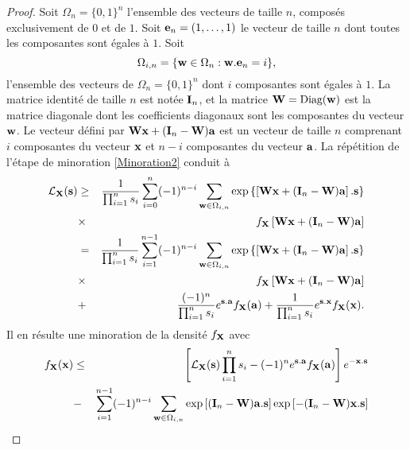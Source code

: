\begin{proof}
Soit $\Omega_{n}=\{0,1\}^{n}$ l'ensemble des vecteurs de taille $n$, composés exclusivement de $0$ et de $1$. Soit $\bold{e}_{n}=(1,\ldots,1)$ le vecteur de taille $n$ dont toutes les composantes sont égales à $1$. Soit 
\begin{equation*}
\Omega_{i,n}=\{\bold{w}\in\Omega_{n} : \bold{w}.\bold{e}_{n}=i\},
\end{equation*}
l'ensemble des vecteurs de $\Omega_{n}=\{0,1\}^{n}$ dont $i$ composantes sont égales à $1$. La matrice identité de taille $n$ est notée $\bold{I}_{n}$, et la matrice $\bold{W}=\text{Diag}(\bold{w})$ est la matrice diagonale dont les coefficients diagonaux sont les composantes du vecteur $\bold{w}$. Le vecteur défini par $\bold{W}\bold{x}+(\bold{I}_{n}-\bold{W})\bold{a}$ est un vecteur de taille $n$ comprenant $i$ composantes du vecteur $\bold{x}$ et $n-i$ composantes du vecteur $\bold{a}$.  La répétition de l'étape de minoration \eqref{Minoration2} conduit à 
\begin{eqnarray}
\mathcal{L}_{\bold{X}}(\bold{s})&\geq&\frac{1}{\prod_{i=1}^{n}s_{i}}\sum_{i=0}^{n}(-1)^{n-i}\sum_{\bold{w}\in\Omega_{i,n}}\exp\left\{\left[\bold{W}\bold{x}+(\bold{I}_{n}-\bold{W})\bold{a}\right].\bold{s}\right\}\nonumber\\
&\times&f_{\bold{X}}\left[\bold{W}\bold{x}+(\bold{I}_{n}-\bold{W})\bold{a}\right]\label{MinorationLaplaceTransform1}\\
&=&\frac{1}{\prod_{i=1}^{n}s_{i}}\sum_{i=1}^{n-1}(-1)^{n-i}\sum_{\bold{w}\in\Omega_{i,n}}\exp\left\{\left[\bold{W}\bold{x}+(\bold{I}_{n}-\bold{W})\bold{a}\right].\bold{s}\right\}\nonumber\\
&\times&f_{\bold{X}}\left[\bold{W}\bold{x}+(\bold{I}_{n}-\bold{W})\bold{a}\right]\nonumber\\
&+&\frac{(-1)^{n}}{\prod_{i=1}^{n}s_{i}}e^{\bold{s}.\bold{a}}f_{\bold{X}}(\bold{a})+\frac{1}{\prod_{i=1}^{n}s_{i}}e^{\bold{s}.\bold{x}}f_{\bold{X}}(\bold{x}).\label{MinorationLaplaceTransform2}
\end{eqnarray}
Il  en résulte une minoration de la densité $f_{\bold{X}}$ avec
\begin{eqnarray}
f_{\bold{X}}(\bold{x})&\leq&\left[\mathcal{L}_{\bold{X}}(\bold{s})\prod_{i=1}^{n}s_{i}-(-1)^{n}e^{\bold{s}.\bold{a}}f_{\bold{X}}(\bold{a})\right]e^{-\bold{x}.\bold{s}}\nonumber\\
&-&\sum_{i=1}^{n-1}(-1)^{n-i}\sum_{\bold{w}\in\Omega_{i,n}}\exp\left[(\bold{I}_{n}-\bold{W})\bold{a}.\bold{s}\right]\exp\left[-(\bold{I}_{n}-\bold{W})\bold{x}.\bold{s}\right]\nonumber\\

\end{eqnarray}
\end{proof}
